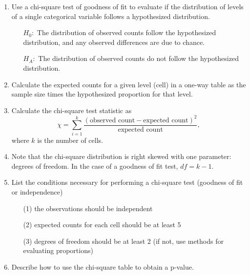 \documentclass[11pt]{article}
\begin{document}
\begin{enumerate}[resume]
\renewcommand\labelenumi{\textcolor{light}{\textbf{LO \theenumi.}}}

\item Use a chi-square test of goodness of fit to evaluate if the distribution of levels of a single categorical variable follows a hypothesized distribution.
\begin{itemize}
\item[] $H_0:$ The distribution of observed counts follow the hypothesized distribution, and any observed differences are due to chance.
\item[] $H_A:$ The distribution of observed counts do not follow the hypothesized distribution.
\end{itemize}

\item Calculate the expected counts for a given level (cell) in a one-way table as the sample size times the hypothesized proportion for that level.

\item Calculate the chi-square test statistic as 
\[ \chi = \sum_{i = 1}^{k}  \frac{(\text{observed count} - \text{expected count})^2}{\text{expected count}}, \]
where $k$ is the number of cells.

\item Note that the chi-square distribution is right skewed with one parameter: degrees of freedom. In the case of a goodness of fit test, $df = k - 1$.

\item List the conditions necessary for performing a chi-square test (goodness of fit or independence)
\begin{enumerate}
\item[(1)] the observations should be independent
\item[(2)] expected counts for each cell should be at least 5
\item[(3)] degrees of freedom should be at least 2 (if not, use methods for evaluating proportions)
\end{enumerate}

\item Describe how to use the chi-square table to obtain a p-value.

\end{enumerate}
\end{document}
